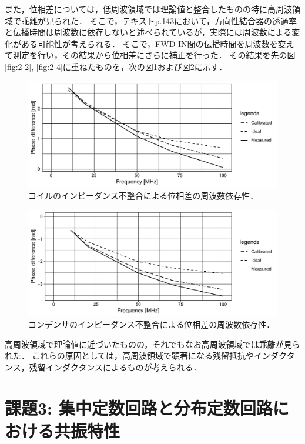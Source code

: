 \documentclass[uplatex,dvipdfmx,a4j,12pt]{jsarticle}
\begin{document}
また，位相差については，低周波領域では理論値と整合したものの特に高周波領域で乖離が見られた．
そこで，テキストp.143において，方向性結合器の透過率と伝播時間は周波数に依存しないと述べられているが，実際には周波数による変化がある可能性が考えられる．
そこで，FWD-IN間の伝播時間を周波数を変えて測定を行い，その結果から位相差にさらに補正を行った．
その結果を先の図\ref{fig:2-2}, \ref{fig:2-4}に重ねたものを，次の図\ref{fig:2-5}および図\ref{fig:2-6}に示す．
\begin{figure}[H]
    \centering
    \includegraphics[width=\linewidth]{data/2_1/phase_diff2.pdf}
    \caption{コイルのインピーダンス不整合による位相差の周波数依存性．}
    \label{fig:2-5}
\end{figure}

\begin{figure}[H]
  \centering
  \includegraphics[width=\linewidth]{data/2_2/phase_diff2.pdf}
  \caption{コンデンサのインピーダンス不整合による位相差の周波数依存性．}
  \label{fig:2-6}
\end{figure}

高周波領域で理論値に近づいたものの，それでもなお高周波領域では乖離が見られた．
これらの原因としては，高周波領域で顕著になる残留抵抗やインダクタンス，残留インダクタンスによるものが考えられる．

\section{課題3: 集中定数回路と分布定数回路における共振特性}
\end{document}
